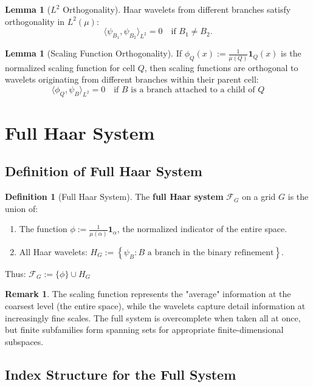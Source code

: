 \documentclass[12pt,a4paper]{article}
\theoremstyle{definition}
\newtheorem{definition}{Definition}[section]
\newtheorem{lemma}[theorem]{Lemma}
\newtheorem{remark}{Remark}[section]
\newcommand{\myset}[1]{\left\{#1\right\}}
\newcommand{\inner}[2]{\langle #1, #2 \rangle}
\begin{document}
\begin{lemma}[$L^2$ Orthogonality]
Haar wavelets from different branches satisfy orthogonality in $L^2(\mu)$:
$$\inner{\psi_{B_1}}{\psi_{B_2}}_{L^2} = 0 \quad \text{if } B_1 \neq B_2.$$
\end{lemma}

\begin{lemma}[Scaling Function Orthogonality]
If $\phi_Q(x) := \frac{1}{\mu(Q)} \mathbf{1}_Q(x)$ is the normalized scaling function for cell $Q$, then scaling functions are orthogonal to wavelets originating from different branches within their parent cell:
$$\inner{\phi_Q}{\psi_B}_{L^2} = 0 \quad \text{if } B \text{ is a branch attached to a child of } Q$$
\end{lemma}

\newpage

\section{Full Haar System}

\subsection{Definition of Full Haar System}

\begin{definition}[Full Haar System]
The \textbf{full Haar system} $\mathcal{F}_G$ on a grid $G$ is the union of:
\begin{enumerate}[label=(\roman*)]
  \item The   function $\phi := \frac{1}{\mu(\alpha)} \mathbf{1}_{\alpha}$, the normalized indicator of the entire space.
  \item All Haar wavelets: $H_G := \myset{\psi_B : B \text{ a branch in the binary refinement}}$.
\end{enumerate}

Thus: $\mathcal{F}_G := \{\phi\} \cup H_G$
\end{definition}

\begin{remark}
The scaling function represents the "average" information at the coarsest level (the entire space), while the wavelets capture detail information at increasingly fine scales. The full system is overcomplete when taken all at once, but finite subfamilies form spanning sets for appropriate finite-dimensional subspaces.
\end{remark}

\subsection{Index Structure for the Full System}
\end{document}
